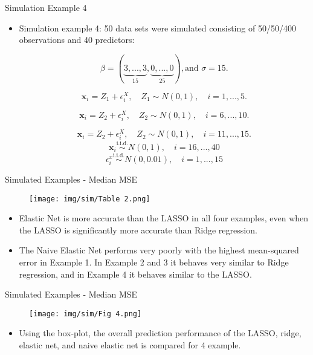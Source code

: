     \begin{frame}{Simulation Example 4}
        \begin{itemize}
            \item Simulation example 4: 50 data sets were simulated consisting of 50/50/400 observations and 40 predictors:

$$\beta= ( \underbrace{3, ..., 3}_{15}, \underbrace{0, ..., 0}_{25}) , \text{and }\sigma=15.$$

$$\mathbf{x}_{i}=Z_1+\epsilon_i^X,\quad Z_1\sim N(0,1),\quad i=1,...,5.$$

$$\mathbf{x}_{i}=Z_2+\epsilon_i^X,\quad Z_2\sim N(0,1),\quad i=6,...,10.$$

$$\mathbf{x}_{i}=Z_2+\epsilon_i^X,\quad Z_2\sim N(0,1),\quad i=11,...,15.$$
 $$\mathbf{x}_{i}\overset{\mathrm{i.i.d.}}{\operatorname*{\sim}}N(0,1),\quad i=16,...,40$$
 $$\epsilon_i^x\stackrel{\mathrm{i.i.d.}}{\sim}N(0,0.01),\quad i=1,...,15$$
            
        \end{itemize}
    \end{frame}

    \begin{frame}{Simulated Examples - Median MSE}
        \begin{figure}
            \centering
            \texttt{[image: img/sim/Table 2.png]}
            \label{fig:enter-label}
        \end{figure}
        \begin{itemize}
            \item Elastic Net is more accurate than the LASSO in all four examples, even when the LASSO is significantly more accurate than Ridge regression.
            \item The Naive Elastic Net performs very poorly with the highest mean-squared error in Example 1. In Example 2 and 3 it behaves very similar to Ridge regression, and in Example 4 it behaves similar to the LASSO.
        \end{itemize}
    \end{frame}

    \begin{frame}{Simulated Examples - Median MSE}
        \begin{figure}
            \centering
            \texttt{[image: img/sim/Fig 4.png]}
            \label{fig:enter-label}
        \end{figure}
        \begin{itemize}
            \item Using the box-plot, the overall prediction performance of the LASSO, ridge, elastic net, and naive elastic net is compared for 4 example.
        \end{itemize}
    \end{frame}

